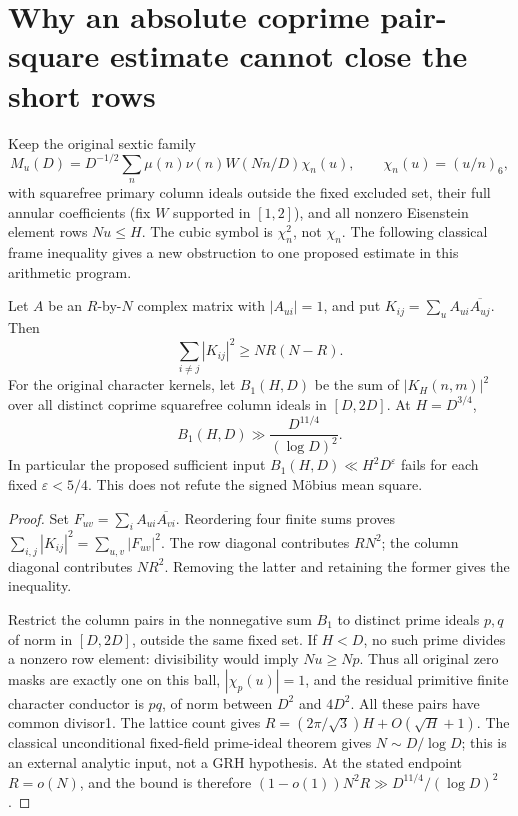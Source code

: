 \section{Why an absolute coprime pair-square estimate cannot close the short rows}
\label{sec:pair-barrier}
Keep the original sextic family
\[
 M_u(D)=D^{-1/2}\sum_n\mu(n)\nu(n)W(Nn/D)\chi_n(u),
 \qquad \chi_n(u)=(u/n)_6,
\]
with squarefree primary column ideals outside the fixed excluded set,
their full annular coefficients (fix $W$ supported in $[1,2]$), and all
nonzero Eisenstein element rows
$Nu\le H$. The cubic symbol is $\chi_n^2$, not $\chi_n$.
The following classical frame inequality \cite{WelchGeometry} gives a new
obstruction to one proposed estimate in this arithmetic program.

\begin{proposition}\label{prop:pair-barrier}
Let $A$ be an $R$-by-$N$ complex matrix with $|A_{ui}|=1$, and put
$K_{ij}=\sum_u A_{ui}\overline{A_{uj}}$. Then
\[
 \sum_{i\ne j}|K_{ij}|^2\ge NR(N-R).
\]
For the original character kernels, let $B_1(H,D)$ be the sum of
$|K_H(n,m)|^2$ over all distinct coprime squarefree column ideals in
$[D,2D]$. At $H=D^{3/4}$,
\[
 B_1(H,D)\gg \frac{D^{11/4}}{(\log D)^2}.
\]
In particular the proposed sufficient input
$B_1(H,D)\ll H^2D^\varepsilon$ fails for each fixed $\varepsilon<5/4$.
This does not refute the signed M\"obius mean square.
\end{proposition}
\begin{proof}
Set $F_{uv}=\sum_i A_{ui}\overline{A_{vi}}$. Reordering four finite sums
proves $\sum_{i,j}|K_{ij}|^2=\sum_{u,v}|F_{uv}|^2$.
The row diagonal contributes $RN^2$; the column diagonal contributes
$NR^2$. Removing the latter and retaining the former gives the inequality.

Restrict the column pairs in the nonnegative sum $B_1$ to distinct prime
ideals $p,q$ of norm in $[D,2D]$, outside the same fixed set. If $H<D$,
no such prime divides a nonzero row element: divisibility would imply
$Nu\ge Np$. Thus all original zero masks are exactly one on this ball,
$|\chi_p(u)|=1$, and the residual primitive finite character conductor is
$pq$, of norm between $D^2$ and $4D^2$. All these pairs have common divisor1.
The lattice count gives $R=(2\pi/\sqrt3)H+O(\sqrt H+1)$.
The classical unconditional fixed-field prime-ideal theorem gives
$N\sim D/\log D$; this is an external analytic input, not a GRH hypothesis.
At the stated endpoint $R=o(N)$, and the bound is therefore
$(1-o(1))N^2R\gg D^{11/4}/(\log D)^2$.
\end{proof}


